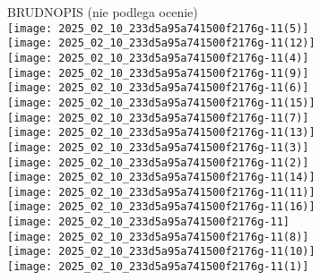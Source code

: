 \documentclass[10pt]{article}
\begin{document}
BRUDNOPIS (nie podlega ocenie)\\
\(\qquad\)\\
\texttt{[image: 2025\_02\_10\_233d5a95a741500f2176g-11(5)]}\\
\(\qquad\)\\
\texttt{[image: 2025\_02\_10\_233d5a95a741500f2176g-11(12)]}\\
\texttt{[image: 2025\_02\_10\_233d5a95a741500f2176g-11(4)]}\\
\texttt{[image: 2025\_02\_10\_233d5a95a741500f2176g-11(9)]}\\
\(\qquad\)\\
\texttt{[image: 2025\_02\_10\_233d5a95a741500f2176g-11(6)]}\\
\(\qquad\)\\
\(\qquad\)\\
\texttt{[image: 2025\_02\_10\_233d5a95a741500f2176g-11(15)]}\\
\texttt{[image: 2025\_02\_10\_233d5a95a741500f2176g-11(7)]}\\
\texttt{[image: 2025\_02\_10\_233d5a95a741500f2176g-11(13)]}\\
\texttt{[image: 2025\_02\_10\_233d5a95a741500f2176g-11(3)]}\\
\texttt{[image: 2025\_02\_10\_233d5a95a741500f2176g-11(2)]}\\
\(\qquad\)\\
\texttt{[image: 2025\_02\_10\_233d5a95a741500f2176g-11(14)]}\\
\texttt{[image: 2025\_02\_10\_233d5a95a741500f2176g-11(11)]}\\
\texttt{[image: 2025\_02\_10\_233d5a95a741500f2176g-11(16)]}\\
\texttt{[image: 2025\_02\_10\_233d5a95a741500f2176g-11]}\\
\(\qquad\)\\
\texttt{[image: 2025\_02\_10\_233d5a95a741500f2176g-11(8)]}\\
\texttt{[image: 2025\_02\_10\_233d5a95a741500f2176g-11(10)]}\\
\texttt{[image: 2025\_02\_10\_233d5a95a741500f2176g-11(1)]}
\end{document}
